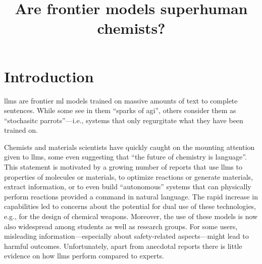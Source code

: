 \documentclass[11pt, oneside]{article}
\title{\textsf{Are frontier models superhuman chemists?}}
\begin{document}
\maketitle

\begin{abstract}
\end{abstract}

\clearpage

\section{Introduction}
\Glspl{llm} are frontier \gls{ml} models trained on massive amounts of text to complete sentences.
While some see in them \enquote{sparks of \gls{agi}},\cite{bubeck2023sparks} others consider them as \enquote{stochasitc parrots}---i.e., systems that only regurgitate what they have been trained on.\cite{bender2021dangers}

Chemists and materials scientists have quickly caught on the mounting attention given to \glspl{llm}, some even suggesting that \enquote{the future of chemistry is language}.\cite{White_2023}
This statement is motivated by a growing number of reports that use \glspl{llm} to properties of molecules or materials,\cite{jablonka202314, jablonka2024leveraging, xie2024fine} to optimize reactions\cite{ramos2023bayesian, kristiadi2024sober} or generate materials,\cite{rubungo2023llm, flam2023language, gruver2024fine} extract information,\cite{Patiny_2023, Dagdelen_2024, Zheng_2024, lála2023paperqa, caufield2023structured} or to even build \enquote{autonomous} systems that can physically perform reactions provided a command in natural language.\cite{bran2023chemcrow, Boiko_2023, darvish2024organa}
The rapid increase in capabilities led to concerns about the potential for dual use of these technologies, e.g., for the design of chemical weapons.\cite{gopal2023releasing, ganguli2022red, Urbina_2022}
Moreover, the use of these models is now also widespread among students\cite{Intelligent.com_2023} as well as research groups. For some users, misleading information---especially about safety-related aspects---might lead to harmful outcomes. Unfortunately, apart from anecdotal reports there is little evidence on how \glspl{llm} perform compared to experts.
\end{document}
